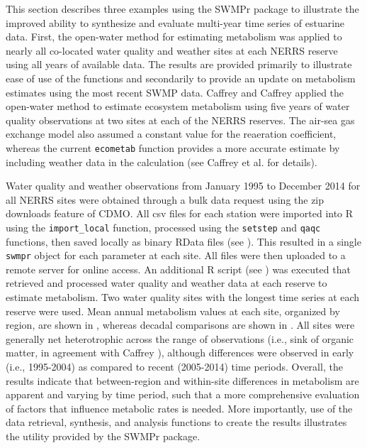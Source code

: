\documentclass[10pt,letterpaper]{article}\usepackage[]{graphicx}\usepackage[]{color}
\begin{document}
This section describes three examples using the SWMPr package to illustrate the improved ability to synthesize and evaluate multi-year time series of estuarine data. First, the open-water method for estimating metabolism was applied to nearly all co-located water quality and weather sites at each \gls{NERRS} reserve using all years of available data.  The results are provided primarily to illustrate ease of use of the functions and secondarily to provide an update on metabolism estimates using the most recent \gls{SWMP} data.  Caffrey \cite{Caffrey03} and Caffrey \cite{Caffrey04} applied the open-water method to estimate ecosystem metabolism using five years of water quality observations at two sites at each of the \gls{NERRS} reserves.  The air-sea gas exchange model also assumed a constant value for the reaeration coefficient, whereas the current \texttt{ecometab} function provides a more accurate estimate by including weather data in the calculation (see Caffrey et al. \cite{Caffrey14} for details).

Water quality and weather observations from January 1995 to December 2014 for all \gls{NERRS} sites were obtained through a bulk data request using the zip downloads feature of \gls{CDMO}.  All csv files for each station were imported into R using the \texttt{import\_local} function, processed using the \texttt{setstep} and \texttt{qaqc} functions, then saved locally as binary RData files (see ). This resulted in a single \texttt{swmpr} object for each parameter at each site.  All files were then uploaded to a remote server for online access.  An additional R script (see ) was executed that retrieved and processed water quality and weather data at each reserve to estimate metabolism.  Two water quality sites with the longest time series at each reserve were used.  Mean annual metabolism values at each site, organized by region, are shown in , whereas decadal comparisons are shown in .  All sites were generally net heterotrophic across the range of observations (i.e., sink of organic matter, in agreement with Caffrey \cite{Caffrey03}), although differences were observed in early (i.e., 1995-2004) as compared to recent (2005-2014) time periods. Overall, the results indicate that between-region and within-site differences in metabolism are apparent and varying by time period, such that a more comprehensive evaluation of factors that influence metabolic rates is needed.  More importantly, use of the data retrieval, synthesis, and analysis functions to create the results illustrates the utility provided by the SWMPr package.
\end{document}

